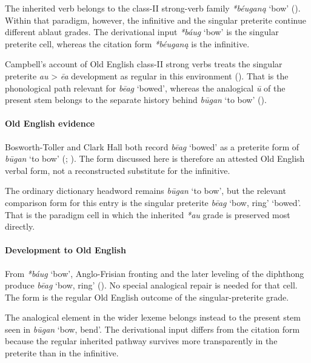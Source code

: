 \documentclass[
  british,
  a4paper,
]{article}
\providecommand{\Recon}[1]{\emph{*#1}}
\begin{document}
The inherited verb belongs to the class-II strong-verb family
\Recon{béuganą} `bow' (). Within that paradigm, however, the infinitive and the
singular preterite continue different ablaut grades. The derivational
input \Recon{báug} `bow' is the singular preterite cell, whereas the
citation form \Recon{béuganą} is the infinitive.

Campbell's account of Old English class-II strong verbs treats the
singular preterite \emph{au} \textgreater{} \emph{ēa} development as
regular in this environment (). That is the phonological path relevant for {\emph{bēag}} `bowed',
whereas the analogical \emph{ū} of the present stem belongs to the
separate history behind {\emph{būgan}} `to bow'
().

\paragraph{Old English evidence}\label{old-english-evidence-119}

Bosworth-Toller and Clark Hall both record {\emph{bēag}} `bowed' as a
preterite form of {\emph{būgan}} `to bow'
(;
). The form discussed
here is therefore an attested Old English verbal form, not a
reconstructed substitute for the infinitive.

The ordinary dictionary headword remains {\emph{būgan}} `to bow', but
the relevant comparison form for this entry is the singular preterite
{\emph{bēag}} `bow, ring' `bowed'. That is the paradigm cell in which
the inherited \emph{*au} grade is preserved most directly.

\paragraph{Development to Old
English}\label{development-to-old-english-119}

From \Recon{báug} `bow', Anglo-Frisian fronting and the later leveling
of the diphthong produce {\emph{bēag}} `bow, ring'
(). No special analogical
repair is needed for that cell. The form is the regular Old English
outcome of the singular-preterite grade.

The analogical element in the wider lexeme belongs instead to the
present stem seen in {\emph{būgan}} `bow, bend'. The derivational input
differs from the citation form because the regular inherited pathway
survives more transparently in the preterite than in the infinitive.
\end{document}
